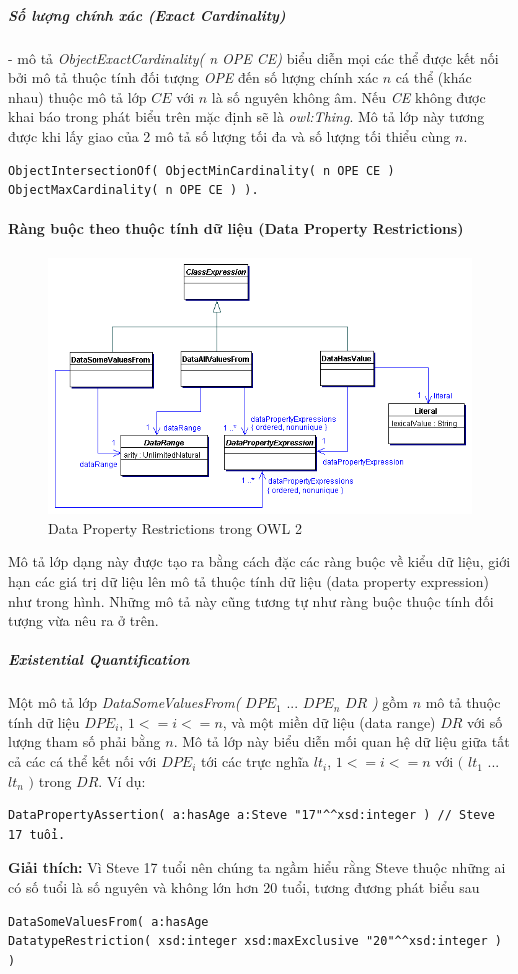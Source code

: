 \subparagraph{Số lượng chính xác (Exact Cardinality)} - mô tả \textit{ObjectExactCardinality( n OPE CE)} biểu diễn mọi các thể được kết nối bởi mô tả thuộc tính đối tượng \textit{OPE} đến số lượng chính xác $n$ cá thể (khác nhau) thuộc mô tả lớp $CE$ với $n$ là số nguyên không âm. Nếu \textit{CE} không được khai báo trong phát biểu trên mặc định sẽ là \textit{owl:Thing}. Mô tả lớp này tương được khi lấy giao của 2 mô tả số lượng tối đa và số lượng tối thiểu cùng $n$.
\begin{verbatim}
ObjectIntersectionOf( ObjectMinCardinality( n OPE CE ) 
ObjectMaxCardinality( n OPE CE ) ).
\end{verbatim}

\paragraph{Ràng buộc theo thuộc tính dữ liệu (Data Property Restrictions)}
\begin{figure}[h]
	\centering
	\includegraphics[width=150mm]{Figures/ce_3.png}
	\caption{Data Property Restrictions trong OWL 2\label{overflow}}
\end{figure}
Mô tả lớp dạng này được tạo ra bằng cách đặc các ràng buộc về kiểu dữ liệu, giới hạn các giá trị dữ liệu lên mô tả thuộc tính dữ liệu (data property expression) như trong hình. Những mô tả này cũng tương tự như ràng buộc thuộc tính đối tượng vừa nêu ra ở trên.

\subparagraph{Existential Quantification} Một mô tả lớp \textit{DataSomeValuesFrom(} $DPE_{1}$ ... $DPE_{n}$ $DR$ \textit{)} gồm $n$ mô tả thuộc tính dữ liệu $DPE_{i}$, $1<=i<=n$, và một miền dữ liệu (data range) $DR$ với số lượng tham số phải bằng $n$. Mô tả lớp này biểu diễn mối quan hệ dữ liệu giữa tất cả các cá thể kết nối với $DPE_{i}$ tới các trực nghĩa $lt_{i}$, $1<=i<=n$ với $($ $lt_{1}$ ... $lt_{n}$ $)$ trong $DR$. Ví dụ:
\begin{verbatim}
DataPropertyAssertion( a:hasAge a:Steve "17"^^xsd:integer ) // Steve 17 tuổi.
\end{verbatim}
\textbf{Giải thích:} Vì Steve 17 tuổi nên chúng ta ngầm hiểu rằng Steve thuộc những ai có số tuổi là số nguyên và không lớn hơn 20 tuổi, tương đương phát biểu sau
\begin{verbatim}
DataSomeValuesFrom( a:hasAge 
DatatypeRestriction( xsd:integer xsd:maxExclusive "20"^^xsd:integer ) )
\end{verbatim}

